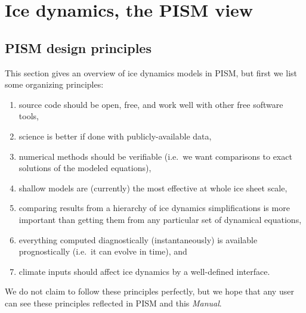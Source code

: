 \documentclass[titlepage,letterpaper,final]{scrartcl}
\begin{document}
\vspace{.5in}
\large
\begin{center}
\normalsize
\end{center}
\normalsize


\clearpage\newpage



\clearpage
\newpage
\section{Ice dynamics, the PISM view}\label{sect:dynamics}

\subsection{PISM design principles}  This section gives an overview of ice dynamics models in PISM, but first we list some organizing principles:
\begin{enumerate}
\item source code should be open, free, and work well with other free software tools,
\item science is better if done with publicly-available data,
\item numerical methods should be verifiable (i.e.~we want comparisons to exact solutions of the modeled equations),
\item shallow models are (currently) the most effective at whole ice sheet scale,
\item comparing results from a hierarchy of ice dynamics simplifications is more important than getting them from any particular set of dynamical equations,
\item everything computed diagnostically (instantaneously) is available prognostically (i.e.~it can evolve in time), and
\item climate inputs should affect ice dynamics by a well-defined interface.
\end{enumerate}

\noindent We do not claim to follow these principles perfectly, but we hope that any user can see these principles reflected in PISM and this \emph{Manual}.
\end{document}
